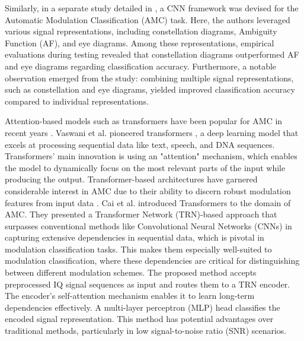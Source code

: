 Similarly, in a separate study detailed in \cite{10139474}, a CNN framework was devised for the Automatic Modulation Classification (AMC) task. Here, the authors leveraged various signal representations, including constellation diagrams, Ambiguity Function (AF), and eye diagrams. Among these representations, empirical evaluations during testing revealed that constellation diagrams outperformed AF and eye diagrams regarding classification accuracy. Furthermore, a notable observation emerged from the study: combining multiple signal representations, such as constellation and eye diagrams, yielded improved classification accuracy compared to individual representations.

Attention-based models such as transformers have been popular for AMC in recent years \cite{dao2023vt, hamidi2021mcformer, cai2022signal}. Vaswani et al. pioneered transformers \cite{vaswani2017attention}, a deep learning model that excels at processing sequential data like text, speech, and DNA sequences. Transformers' main innovation is using an "attention" mechanism, which enables the model to dynamically focus on the most relevant parts of the input while producing the output. Transformer-based architectures have garnered considerable interest in AMC due to their ability to discern robust modulation features from input data \cite{cai2022signal, kong2023transformer, qu2024enhancing}. Cai et al. \cite{cai2022signal} introduced Transformers to the domain of AMC. They presented a Transformer Network (TRN)-based approach that surpasses conventional methods like Convolutional Neural Networks (CNNs) in capturing extensive dependencies in sequential data, which is pivotal in modulation classification tasks. This makes them especially well-suited to modulation classification, where these dependencies are critical for distinguishing between different modulation schemes. The proposed method accepts preprocessed IQ signal sequences as input and routes them to a TRN encoder. The encoder's self-attention mechanism enables it to learn long-term dependencies effectively. A multi-layer perceptron (MLP) head classifies the encoded signal representation. This method has potential advantages over traditional methods, particularly in low signal-to-noise ratio (SNR) scenarios. 

